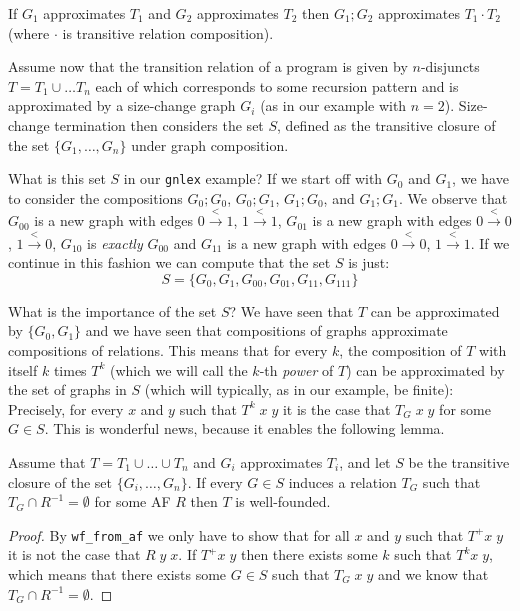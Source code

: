 \documentclass{llncs}
\begin{document}
\vspace{5pt}\begin{proposition}
If $G_1$ approximates $T_1$ and $G_2$ approximates $T_2$ then $G_1;G_2$ approximates $T_1{\cdot}T_2$
(where $\cdot$ is transitive relation composition).
\end{proposition}

Assume now that the transition relation of a program is given by $n$-disjuncts 
$T = T_1\cup\ldots T_n$ each of which corresponds to some recursion pattern and is 
approximated by a size-change graph $G_i$ (as in our example with $n = 2$). Size-change 
termination then considers the set $S$, defined as the transitive closure
of the set $\{ G_1,\ldots,G_n \}$ under graph composition.
\vspace{5pt}
\begin{example}
What is this set $S$ in our \lstinline|gnlex| example? If we start off with 
$G_0$ and $G_1$, we have to consider the compositions $G_0;G_0$, $G_0;G_1$, $G_1;G_0$, 
and $G_1;G_1$. We observe that 
$G_{00}$ is a new graph with edges $ 0 \stackrel{<}{\longrightarrow} 1$, $1 \stackrel{<}{\longrightarrow} 1$, 
$G_{01}$ is a new graph with edges $ 0 \stackrel{<}{\longrightarrow} 0$, $1 \stackrel{<}{\longrightarrow} 0$, 
$G_{10}$ is {\em exactly} $G_{00}$ and $G_{11}$ is a new graph with 
edges $ 0 \stackrel{<}{\longrightarrow} 0$, $1 \stackrel{<}{\longrightarrow} 1$. If we continue in this fashion
we can compute that the set $S$ is just:
\[ S = \{ G_0, G_1, G_{00}, G_{01}, G_{11}, G_{111} \} \] 
\end{example}

What is the importance of the set $S$? We have seen that $T$ can be approximated
by $\{G_0,G_1\}$ and we have seen that compositions of graphs approximate compositions of 
relations. This means that for every $k$, the composition of $T$ with itself $k$ times
$T^k$ (which we will call the $k$-th {\em power} of $T$) can be approximated by the set 
of graphs in $S$ (which will typically, as in our example, be finite): Precisely, for 
every $x$ and $y$ such that $T^{k}\;x\;y$ it is the case that $T_{G}\;x\;y$ for 
some $G \in S$. This is wonderful news, because it enables the following lemma. 

\vspace{5pt}\begin{lemma}\label{lem:general-sct}
Assume that $T = T_1\cup\ldots\cup T_n$ and $G_i$ approximates $T_i$, and let $S$ be the transitive 
closure of the set $\{G_i,\ldots,G_n\}$. If every $G \in S$ induces a relation $T_G$ such that
$T_G \cap R^{-1} = \emptyset $ for some AF $R$ then $T$ is well-founded.
\end{lemma} 
\begin{proof} 
By \lstinline|wf_from_af| we only have to show that for all $x$ and $y$ 
such that $T^{+} x\;y$ it is not the case that $R\;y\;x$. If
$T^{+}x\;y$ then there exists some $k$ such that $T^{k}x\;y$, which means that 
there exists some $G \in S$ such that $T_G\;x\;y$ and we know that $T_G \cap R^{-1} = \emptyset$.
\end{proof}
\end{document}
